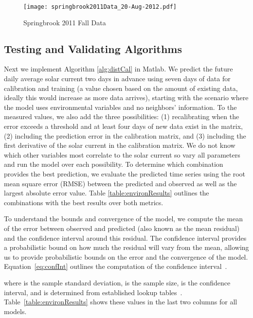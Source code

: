 \documentclass[prodmode,acmtosn]{acmsmall}
\begin{document}
\begin{figure}
\centering
  \texttt{[image: springbrook2011Data\_20-Aug-2012.pdf]}
\caption{Springbrook 2011 Fall Data}
\label{fig:springbrook2011Data}
\end{figure}

\subsection{Testing and Validating Algorithms}
Next we implement Algorithm \ref{alg:distCal} in Matlab.
We predict the future daily average solar current two days in advance using seven days of data for calibration and training (a value chosen based on the amount of existing data, ideally this would increase as more data arrives), starting with the scenario where the model uses environmental variables and no neighbors' information.
To the measured values, we also add the three possibilities: (1) recalibrating when the error exceeds a threshold and at least four days of new data exist in the matrix, (2) including the prediction error in the calibration matrix, and (3) including the first derivative of the solar current in the calibration matrix.
We do not know which other variables most correlate to the solar current so vary all parameters and run the model over each possibility.
To determine which combination provides the best prediction, we evaluate the predicted time series using the root mean square error (RMSE) between the predicted and observed as well as the largest absolute error value.
Table \ref{table:environResults} outlines the combinations with the best results over both metrics.

To understand the bounds and convergence of the model, we compute the mean of the error between observed and predicted (also known as the mean residual) and the  confidence interval around this residual.
The confidence interval provides a probabilistic bound on how much the residual will vary from the mean, allowing us to provide probabilistic bounds on the error and the convergence of the model.
Equation~\ref{eq:confInt} outlines the computation of the confidence interval~\cite{Ramsay2002StatisticalSlueth}.


where  is the sample standard deviation,  is the sample size,  is the confidence interval, and  is determined from established lookup tables~\cite{Ramsay2002StatisticalSlueth}.
Table~\ref{table:environResults} shows these values in the last two columns for all models.
\end{document}
